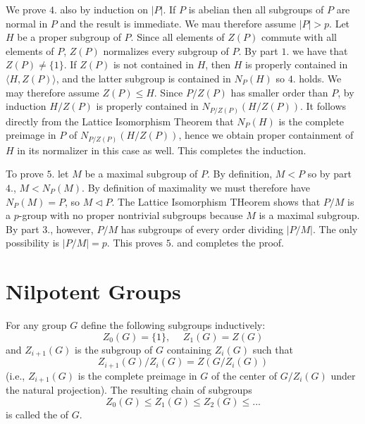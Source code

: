 \documentclass[12pt, a4paper, twoside, openright, titlepage]{book}
\begin{document}
\begin{proof*}{}{}
    We prove $4.$ also by induction on $|P|$. If $P$ is abelian then all subgroups of $P$ are normal in $P$ and the result is immediate. We mau therefore assume $|P| > p$. Let $H$ be a proper subgroup of $P$. Since all elements of $Z(P)$ commute with all elements of $P$, $Z(P)$ normalizes every subgroup of $P$. By part $1.$ we have that $Z(P) \neq \{1\}$. If $Z(P)$ is not contained in $H$, then $H$ is properly contained in $\langle H,Z(P)\rangle$, and the latter subgroup is contained in $N_P(H)$ so $4.$ holds. We may therefore assume $Z(P) \leq H$. Since $P/Z(P)$ has smaller order than $P$, by induction $H/Z(P)$ is properly contained in $N_{P/Z(P)}(H/Z(P))$. It follows directly from the Lattice Isomorphism Theorem that $N_P(H)$ is the complete preimage in $P$ of $N_{P/Z(P)}(H/Z(P))$, hence we obtain proper containment of $H$ in its normalizer in this case as well. This completes the induction.

    To prove $5.$ let $M$ be a maximal subgroup of $P$. By definition, $M < P$ so by part $4.$, $M < N_P(M)$. By definition of maximality we must therefore have $N_P(M) = P$, so $M \triangleleft P$. The Lattice Isomorphism THeorem shows that $P/M$ is a $p$-group with no proper nontrivial subgroups because $M$ is a maximal subgroup. By part $3.$, however, $P/M$ has subgroups of every order dividing $|P/M|$. The only possibility is $|P/M| = p$. This proves $5.$ and completes the proof.
\end{proof*}


\section{\textsection Nilpotent Groups}

\begin{defn}{}{}
    For any group $G$ define the following subgroups inductively: \begin{equation*}
        Z_0(G) = \{1\}, \hspace{15pt} Z_1(G) = Z(G)
    \end{equation*}
    and $Z_{i+1}(G)$ is the subgroup of $G$ containing $Z_i(G)$ such that \begin{equation*}
        Z_{i+1}(G)/Z_i(G) = Z(G/Z_i(G))
    \end{equation*}
    (i.e., $Z_{i+1}(G)$ is the complete preimage in $G$ of the center of $G/Z_i(G)$ under the natural projection). The resulting chain of subgroups \begin{equation*}
        Z_0(G) \leq Z_1(G) \leq Z_2(G) \leq ...
    \end{equation*}
    is called the  of $G$.
\end{defn}
\end{document}
